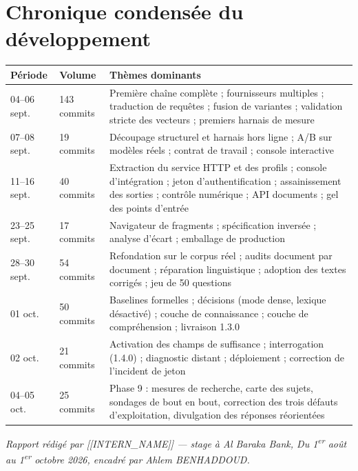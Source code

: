 \documentclass[a4paper,12pt]{report}
\newcommand{\EtudiantNom}{[[INTERN_NAME]]}
\newcommand{\EntrepriseNom}{Al Baraka Bank}
\newcommand{\EncadrantNom}{Ahlem BENHADDOUD}
\newcommand{\StagePeriode}{Du 1\textsuperscript{er} août au 1\textsuperscript{er} octobre 2026}
\begin{document}
\chapter{Chronique condensée du développement}
\begin{table}[H]
\centering
\small
\begin{tabular}{p{2.4cm}p{1.7cm}p{10.5cm}}
\toprule
\textbf{Période} & \textbf{Volume} & \textbf{Thèmes dominants} \\
\midrule
04--06 sept. & 143 commits & Première chaîne complète ; fournisseurs multiples ; traduction de
requêtes ; fusion de variantes ; validation stricte des vecteurs ; premiers harnais de mesure \\
07--08 sept. & 19 commits & Découpage structurel et harnais hors ligne ; A/B sur modèles réels ;
contrat de travail ; console interactive \\
11--16 sept. & 40 commits & Extraction du service HTTP et des profils ; console d'intégration ;
jeton d'authentification ; assainissement des sorties ; contrôle numérique ; API documents ; gel des
points d'entrée \\
23--25 sept. & 17 commits & Navigateur de fragments ; spécification inversée ; analyse d'écart ;
emballage de production \\
28--30 sept. & 54 commits & Refondation sur le corpus réel ; audits document par document ;
réparation linguistique ; adoption des textes corrigés ; jeu de 50 questions \\
01 oct. & 50 commits & Baselines formelles ; décisions (mode dense, lexique désactivé) ; couche de
connaissance ; couche de compréhension ; livraison 1.3.0 \\
02 oct. & 21 commits & Activation des champs de suffisance ; interrogation (1.4.0) ; diagnostic
distant ; déploiement ; correction de l'incident de jeton \\
04--05 oct. & 25 commits & Phase 9 : mesures de recherche, carte des sujets, sondages de bout en
bout, correction des trois défauts d'exploitation, divulgation des réponses réorientées \\
\bottomrule
\end{tabular}
\end{table}

\vfill
\begin{center}
\small \emph{Rapport rédigé par \EtudiantNom{} — stage à \EntrepriseNom, \StagePeriode,
encadré par \EncadrantNom.}
\end{center}
\end{document}
